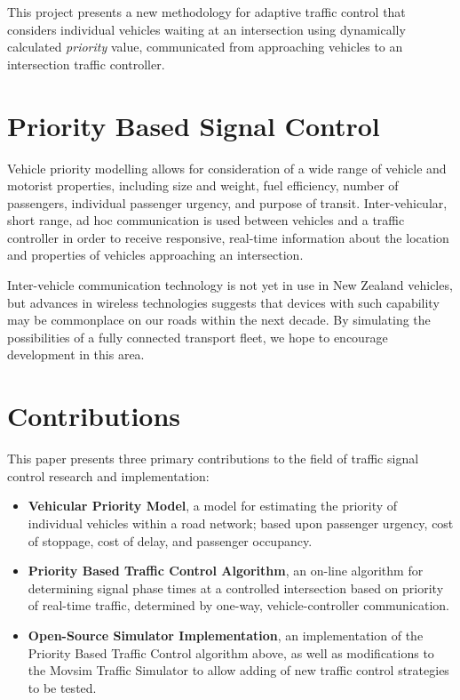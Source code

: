 This project presents a new methodology for adaptive traffic control that considers individual vehicles waiting at an intersection using dynamically calculated \emph{priority} value, communicated from approaching vehicles to an intersection traffic controller.

\section{Priority Based Signal Control}

Vehicle priority modelling allows for consideration of a wide range of vehicle and motorist properties, including size and weight, fuel efficiency, number of passengers, individual passenger urgency, and purpose of transit. Inter-vehicular, short range, ad hoc communication is used between vehicles and a traffic controller in order to receive responsive, real-time information about the location and properties of vehicles approaching an intersection. 

Inter-vehicle communication technology is not yet in use in New Zealand vehicles, but advances in wireless technologies suggests that devices with such capability may be commonplace on our roads within the next decade. By simulating the possibilities of a fully connected transport fleet, we hope to encourage development in this area.

\section{Contributions}

This paper presents three primary contributions to the field of traffic signal control research and implementation:

\begin{itemize}
\item \textbf{Vehicular Priority Model}, a model for estimating the priority of individual vehicles within a road network; based upon passenger urgency, cost of stoppage, cost of delay, and passenger occupancy.
\item \textbf{Priority Based Traffic Control Algorithm}, an on-line algorithm for determining signal phase times at a controlled intersection based on priority of real-time traffic, determined by one-way, vehicle-controller communication. 
\item \textbf{Open-Source Simulator Implementation}, an implementation of the Priority Based Traffic Control algorithm above, as well as modifications to the Movsim Traffic Simulator to allow adding of new traffic control strategies to be tested.
\end{itemize}



